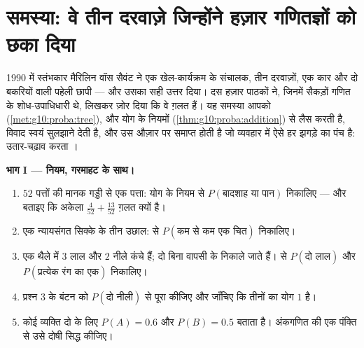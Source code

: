 \section{समस्या: वे तीन दरवाज़े जिन्होंने हज़ार गणितज्ञों को छका दिया}

\begin{problem}
\label{pb:g10:proba:1}
1990 में स्तंभकार मैरिलिन वॉस सैवंट ने एक खेल-कार्यक्रम के संचालक, तीन
दरवाज़ों, एक कार और दो बकरियों वाली पहेली छापी --- और उसका सही उत्तर दिया।
दस हज़ार पाठकों ने, जिनमें सैकड़ों गणित के शोध-उपाधिधारी थे, लिखकर ज़ोर
दिया कि वे ग़लत हैं। यह समस्या आपको  (\cref{met:g10:proba:tree}),  और योग के नियमों
(\cref{thm:g10:proba:addition}) से लैस करती है, विवाद स्वयं सुलझाने देती है, और उस औज़ार पर
समाप्त होती है जो व्यवहार में ऐसे हर झगड़े का पंच है: उतार-चढ़ाव करता
।

\medskip
\noindent\textbf{भाग I --- नियम, गरमाहट के साथ।}
\begin{enumerate}
  \item $52$ पत्तों की मानक गड्डी से एक पत्ता: योग के नियम से $P(\text{बादशाह या पान})$
        निकालिए --- और बताइए कि अकेला $\frac{4}{52} + \frac{13}{52}$ ग़लत क्यों है।
  \item एक न्यायसंगत सिक्के के तीन उछाल:  से $P(\text{कम से कम एक
        चित})$ निकालिए।
  \item एक थैले में $3$ लाल और $2$ नीले कंचे हैं; दो बिना वापसी के
        निकाले जाते हैं।  से $P(\text{दो लाल})$ और $P(\text{प्रत्येक रंग का एक})$ निकालिए।
  \item प्रश्न 3 के बंटन को $P(\text{दो नीली})$ से पूरा कीजिए और जाँचिए कि तीनों
         का योग $1$ है।
  \item कोई व्यक्ति दो \emph{}  के लिए $P(A) = 0.6$ और $P(B) = 0.5$ बताता है।
        अंकगणित की एक पंक्ति से उसे दोषी सिद्ध कीजिए।
\end{enumerate}


\end{problem}
